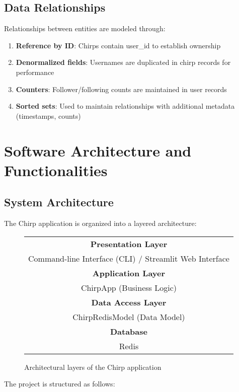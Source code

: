 \documentclass[a4paper,11pt]{article}
\begin{document}
\subsection{Data Relationships}
Relationships between entities are modeled through:

\begin{enumerate}
    \item \textbf{Reference by ID}: Chirps contain user\_id to establish ownership
    \item \textbf{Denormalized fields}: Usernames are duplicated in chirp records for performance
    \item \textbf{Counters}: Follower/following counts are maintained in user records
    \item \textbf{Sorted sets}: Used to maintain relationships with additional metadata (timestamps, counts)
\end{enumerate}

\newpage
\section{Software Architecture and Functionalities}

\subsection{System Architecture}
The Chirp application is organized into a layered architecture:

\begin{figure}[H]
    \centering
    \begin{tabular}{|c|}
        \hline
        \textbf{Presentation Layer} \\
        Command-line Interface (CLI) / Streamlit Web Interface \\
        \hline
        \textbf{Application Layer} \\
        ChirpApp (Business Logic) \\
        \hline
        \textbf{Data Access Layer} \\
        ChirpRedisModel (Data Model) \\
        \hline
        \textbf{Database} \\
        Redis \\
        \hline
    \end{tabular}
    \caption{Architectural layers of the Chirp application}
\end{figure}

The project is structured as follows:
\end{document}
